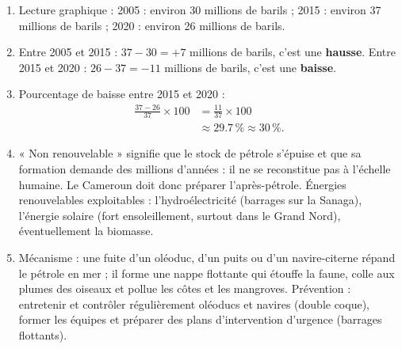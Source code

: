 \documentclass[11pt]{article}
\begin{document}
\begin{corrige}
\begin{enumerate}
\item Lecture graphique : 2005 : environ 30 millions de barils ; 2015 : environ 37 millions de barils ; 2020 : environ 26 millions de barils.
\item Entre 2005 et 2015 : $37 - 30 = +7$ millions de barils, c'est une \textbf{hausse}. Entre 2015 et 2020 : $26 - 37 = -11$ millions de barils, c'est une \textbf{baisse}.
\item Pourcentage de baisse entre 2015 et 2020 :
\begin{align*}
\frac{37 - 26}{37} \times 100 &= \frac{11}{37} \times 100 \\
&\approx \num{29.7}\,\% \approx 30\,\%.
\end{align*}
\item « Non renouvelable » signifie que le stock de pétrole s'épuise et que sa formation demande des millions d'années : il ne se reconstitue pas à l'échelle humaine. Le Cameroun doit donc préparer l'après-pétrole. Énergies renouvelables exploitables : l'hydroélectricité (barrages sur la Sanaga), l'énergie solaire (fort ensoleillement, surtout dans le Grand Nord), éventuellement la biomasse.
\item Mécanisme : une fuite d'un oléoduc, d'un puits ou d'un navire-citerne répand le pétrole en mer ; il forme une nappe flottante qui étouffe la faune, colle aux plumes des oiseaux et pollue les côtes et les mangroves. Prévention : entretenir et contrôler régulièrement oléoducs et navires (double coque), former les équipes et préparer des plans d'intervention d'urgence (barrages flottants).
\end{enumerate}
\end{corrige}
\end{document}
